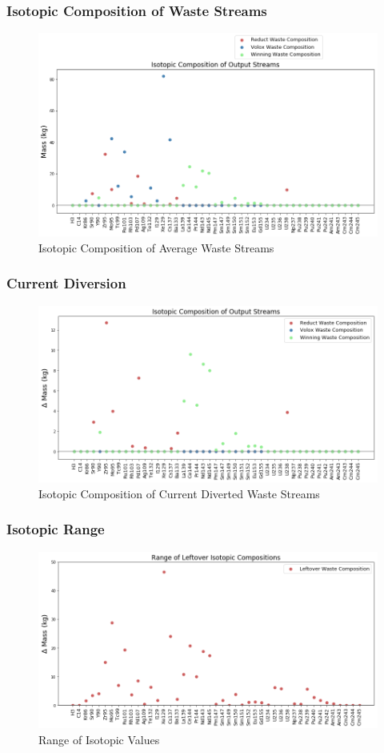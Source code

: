 \begin{frame}
\frametitle{Isotopic Composition of Waste Streams}
  \begin{figure}
  	\centering
  	\includegraphics[width=0.9\linewidth]{avg-isotope-comp}
  	\caption{Isotopic Composition of Average Waste Streams}
  	\label{fig:avg-isotope-comp}
  \end{figure}
\end{frame}

\begin{frame}
\frametitle{Current Diversion}
  \begin{figure}
  	\centering
  	\includegraphics[width=0.9\linewidth]{current-isotope-comp}
  	\caption{Isotopic Composition of Current Diverted Waste Streams}
  	\label{fig:current-isotope-comp}
  \end{figure}
\end{frame}

\begin{frame}
  \frametitle{Isotopic Range}
  \begin{figure}
  	\centering
  	\includegraphics[width=0.9\linewidth]{isotopic-comp-range}
  	\caption{Range of Isotopic Values}
  	\label{fig:isotopic-range}
  \end{figure}
\end{frame}

